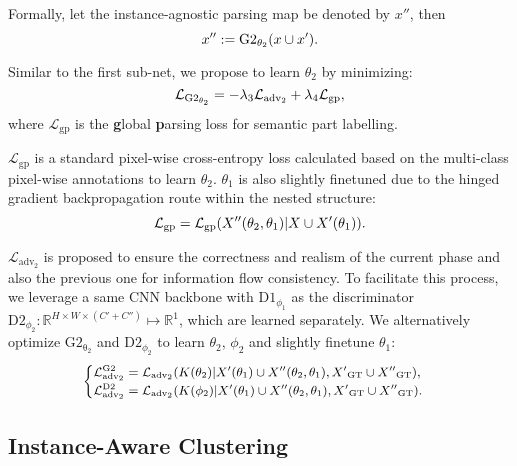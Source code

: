 \documentclass[10pt,twocolumn,letterpaper]{article}
\theoremstyle{definition}
\theoremstyle{remark}
\begin{document}
Formally, let the instance-agnostic parsing map be denoted by $x{''}$, then
\begin{equation}
\small
x{''} := \mathrm{G2}_{\theta_2}(x \cup x{'}).
\end{equation}

Similar to the first sub-net, we propose to learn $\theta_2$ by minimizing:
\begin{equation}
\small
\mathcal{L}_{\mathrm{G2_{\theta_2}}}=-\lambda_3 \mathcal{L}_{\mathrm{adv}_2}+\lambda_4\mathcal{L}_{\mathrm{gp}},
\end{equation}
where $\mathcal{L}_{\mathrm{gp}}$ is the \textbf{g}lobal \textbf{p}arsing loss for semantic part labelling.

$\mathcal{L}_{\mathrm{gp}}$ is a standard pixel-wise cross-entropy loss calculated based on the multi-class pixel-wise annotations to learn $\theta_2$. $\theta_1$ is also slightly finetuned due to the hinged gradient backpropagation route within the nested structure:
\begin{equation}
\small
\mathcal{L}_{\mathrm{gp}} = \mathcal{L}_{\mathrm{gp}}(X{''}(\theta_2, \theta_1)|X \cup X{'}(\theta_1)).
\end{equation}

$\mathcal{L}_{\mathrm{adv}_2}$ is proposed to ensure the correctness and realism of the current phase and also the previous one for information flow consistency. To facilitate this process, we leverage a same CNN backbone with $\mathrm{D1}_{\phi_1}$ as the discriminator $\mathrm{D2}_{\phi_2}: \mathbb{R}^{H \times W \times (C{'}+C{''})} \mapsto \mathbb{R}^{1}$, which are learned separately. We alternatively optimize $\mathrm{G2_{\theta_2}}$ and $\mathrm{D2}_{\phi_2}$ to learn $\theta_2$, $\phi_2$ and slightly finetune $\theta_1$:
\begin{equation}
\small
\begin{cases}
\mathcal{L}_{\mathrm{adv}_2}^{\mathrm{G2}} = \mathcal{L}_{\mathrm{adv}_2}(K(\theta_2)|X{'}(\theta_1) \cup X{''}(\theta_2, \theta_1), X{'}_{\mathrm{GT}} \cup X{''}_{\mathrm{GT}}), \\
\mathcal{L}_{\mathrm{adv}_2}^{\mathrm{D2}} = \mathcal{L}_{\mathrm{adv}_2}(K(\phi_2)|X{'}(\theta_1) \cup X{''}(\theta_2, \theta_1), X{'}_{\mathrm{GT}} \cup X{''}_{\mathrm{GT}}).
\end{cases}
\end{equation}

\subsection{Instance-Aware Clustering}
\end{document}
